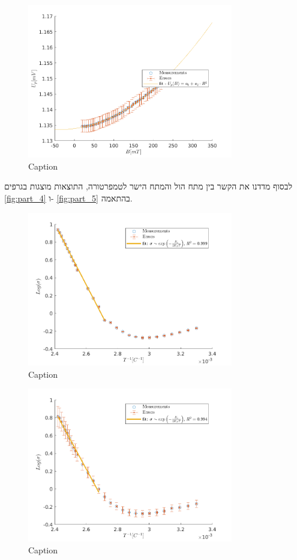 \documentclass{article}
\begin{document}
\begin{figure}[ht!]
    \centering
    \includegraphics[width=0.8\textwidth]{part3 - B-squared relation}
    \caption{Caption}
    \label{fig:part_3}
\end{figure}
    
לבסוף מדדנו את הקשר בין מתח הול והמתח הישר לטמפרטורה,
התוצאות מוצגות בגרפים
\ref{fig:part_4}
ו-
\ref{fig:part_5}
בהתאמה.

\begin{figure}[ht!]
    \centering
    \includegraphics[width=0.8\textwidth]{part4 - E_g.png}
    \caption{Caption}
    \label{fig:part_2}
\end{figure}

\begin{figure}[ht!]
    \centering
    \includegraphics[width=0.8\textwidth]{part5 - E_g with magnetic field.png}
    \caption{Caption}
    \label{fig:part_3}
\end{figure}
\end{document}
